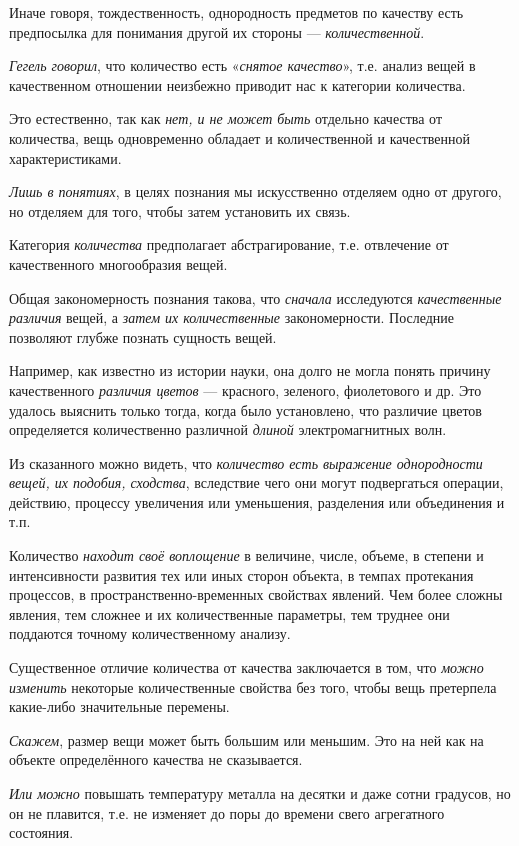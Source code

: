 \documentclass[a4paper,14pt,russian]{extreport}
\begin{document}
Иначе говоря, тождественность, однородность предметов по качеству есть предпосылка для понимания другой их стороны --- \emph{количественной}.

\emph{Гегель говорил}, что количество есть «\emph{снятое качество}», т.е. анализ вещей в качественном отношении неизбежно приводит нас к категории количества.

Это естественно, так как \emph{нет, и не может быть} отдельно качества от количества, вещь одновременно обладает и количественной и качественной характеристиками.

\emph{Лишь в понятиях}, в целях познания мы искусственно отделяем одно от другого, но отделяем для того, чтобы затем установить их связь.

Категория \emph{количества} предполагает абстрагирование, т.е. отвлечение от качественного многообразия вещей.

Общая закономерность познания такова, что \emph{сначала} исследуются \emph{качественные различия} вещей, а \emph{затем их количественные} закономерности. Последние позволяют глубже познать сущность вещей.

Например, как известно из истории науки, она долго не могла понять причину качественного \emph{различия цветов} --- красного, зеленого, фиолетового и др. Это удалось выяснить только тогда, когда было установлено, что различие цветов определяется количественно различной \emph{длиной} электромагнитных волн.

Из сказанного можно видеть, что \emph{количество есть выражение однородности вещей, их подобия, сходства}, вследствие чего они могут подвергаться операции, действию, процессу увеличения или уменьшения, разделения или объединения и т.п.

Количество \emph{находит своё воплощение} в величине, числе, объеме, в степени и интенсивности развития тех или иных сторон объекта, в темпах протекания процессов, в пространственно-временных свойствах явлений. Чем более сложны явления, тем сложнее и их количественные параметры, тем труднее они поддаются точному количественному анализу.

Существенное отличие количества от качества заключается в том, что \emph{можно изменить} некоторые количественные свойства без того, чтобы вещь претерпела какие-либо значительные перемены.

\emph{Скажем}, размер вещи может быть большим или меньшим. Это на ней как на объекте определённого качества не сказывается.

\emph{Или можно} повышать температуру металла на десятки и даже сотни градусов, но он не плавится, т.е. не изменяет до поры до времени свего агрегатного состояния.
\end{document}
